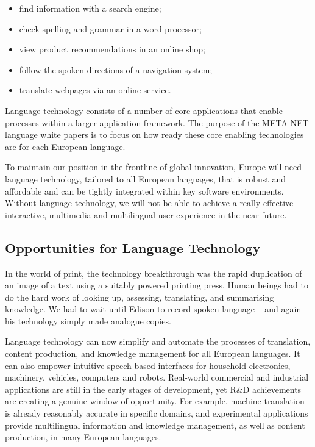 \begin{multicols}{2}
\begin{itemize}
\item find information with a search engine;
\item check spelling and grammar in a word processor;
\item view product recommendations in an online shop;
\item follow the spoken directions of a navigation system;
\item translate webpages via an online service.
\end{itemize}

Language technology consists of a number of core applications that enable processes within a larger application framework. The purpose of the META-NET language white papers is to focus on how ready these core enabling technologies are for each European language. 


To maintain our position in the frontline of global innovation, Europe will need language technology, tailored to all European languages, that is robust and affordable and can be tightly integrated within key software environments. Without language technology, we will not be able to achieve a really effective interactive, multimedia and multilingual user experience in the near future.

\subsection{Opportunities for Language Technology}

In the world of print, the technology breakthrough was the rapid duplication of an image of a text using a suitably powered printing press. Human beings had to do the hard work of looking up, assessing, translating, and summarising knowledge. We had to wait until Edison to record spoken language – and again his technology simply made analogue copies.

Language technology can now simplify and automate the processes of translation, content production, and knowledge management for all European languages. It can also empower intuitive speech-based interfaces for household electronics, machinery, vehicles, computers and robots. Real-world commercial and industrial applications are still in the early stages of development, yet R\&D achievements are creating a genuine window of opportunity. For example, machine translation is already reasonably accurate in specific domains, and experimental applications provide multilingual information and knowledge management, as well as content production, in many European languages. 


\end{multicols}
